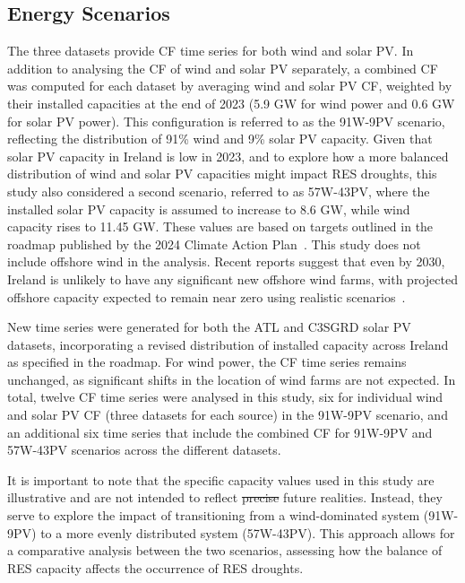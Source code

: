 \documentclass[preprint, 12pt]{elsarticle}
\providecommand{\DIFadd}[1]{{\protect\color{blue}\uwave{#1}}} %
\providecommand{\DIFdel}[1]{{\protect\color{red}\sout{#1}}}                      %
\providecommand{\DIFaddbegin}{} %
\providecommand{\DIFaddend}{} %
\providecommand{\DIFdelbegin}{} %
\providecommand{\DIFdelend}{} %
\begin{document}
\subsection{Energy Scenarios}
\label{sec:scenarios}

The three datasets provide CF time series for both wind and solar PV. In addition to analysing the CF of wind and solar PV separately, a combined CF was computed for each dataset by averaging wind and solar PV CF, weighted by their installed capacities at the end of 2023 (5.9 GW for wind power and 0.6 GW for solar PV power). This configuration is referred to as the 91W-9PV scenario, reflecting the distribution of 91\% wind and 9\% solar PV capacity. Given that solar PV capacity in Ireland is low in 2023, and to explore how a more balanced distribution of wind and solar PV capacities might impact RES droughts, this study also considered a second scenario, referred to as 57W-43PV, where the installed solar PV capacity is assumed to increase to 8.6 GW, while wind capacity rises to 11.45 GW. These values are based on targets outlined in the roadmap published by the 2024 Climate Action Plan~\citep{cap2024future}. This study does not include offshore wind in the analysis. Recent reports suggest that even by 2030, Ireland is unlikely to have any significant new offshore wind farms, with projected offshore capacity expected to remain near zero using realistic scenarios~\citep{seai2024future}.

New time series were generated for both the ATL and C3S\DIFaddbegin \DIFadd{~}\DIFaddend GRD solar PV datasets, incorporating a revised distribution of installed capacity across Ireland as specified in the roadmap. For wind power, the CF time series remains unchanged, as significant shifts in the location of wind farms are not expected. In total, twelve CF time series were analysed in this study, six for individual wind and solar PV CF (three datasets for each source) in the 91W-9PV scenario, and an additional six time series that include the combined CF for 91W-9PV and 57W-43PV scenarios across the different datasets.

It is important to note that the specific capacity values used in this study are illustrative and are not intended to reflect \DIFdelbegin \DIFdel{precise }\DIFdelend \DIFaddbegin \DIFadd{accurate }\DIFaddend future realities. Instead, they serve to explore the impact of transitioning from a wind-dominated system (91W-9PV) to a more evenly distributed system (57W-43PV). This approach allows for a comparative analysis between the two scenarios, assessing how the balance of RES capacity affects the occurrence of RES droughts.
\end{document}
